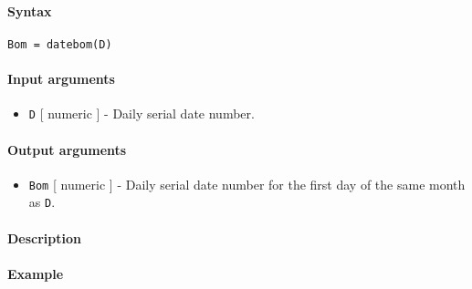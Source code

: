 


	\paragraph{Syntax}\label{syntax}

\begin{verbatim}
Bom = datebom(D)
\end{verbatim}

\paragraph{Input arguments}\label{input-arguments}

\begin{itemize}
\itemsep1pt\parskip0pt
\item
  \texttt{D} {[} numeric {]} - Daily serial date number.
\end{itemize}

\paragraph{Output arguments}\label{output-arguments}

\begin{itemize}
\itemsep1pt\parskip0pt
\item
  \texttt{Bom} {[} numeric {]} - Daily serial date number for the first
  day of the same month as \texttt{D}.
\end{itemize}

\paragraph{Description}\label{description}

\paragraph{Example}\label{example}


